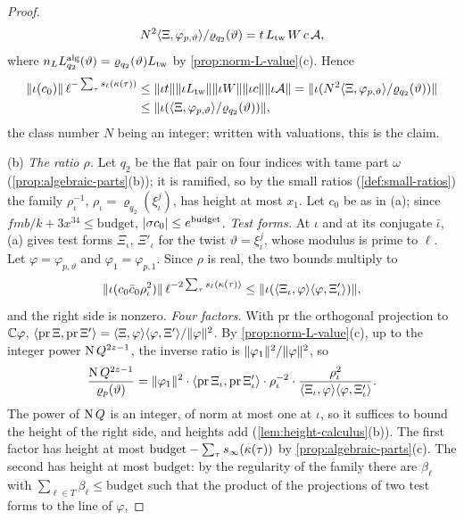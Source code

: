 \begin{proof}
\[
  N^2\langle\Xi,\varphi_{p,\vartheta}\rangle/\varrho_{q_2}(\vartheta)=t\,L_{\rm tw}\,W\,c\,\mathcal A,
\]
where $n_LL^{\rm alg}_{q_2}(\vartheta)=\varrho_{q_2}(\vartheta)L_{\rm tw}$ by \cref{prop:norm-L-value}(c). Hence
\begin{align*}
  \lVert \iota(c_0)\rVert\,\ell^{-\sum_\tau s_\ell(\kappa(\tau))}&\le\lVert \iota t\rVert\lVert \iota L_{\rm tw}\rVert\lVert \iota W\rVert\lVert \iota c\rVert\lVert \iota\mathcal A\rVert
  =\lVert \iota(N^2\langle\Xi,\varphi_{p,\vartheta}\rangle/\varrho_{q_2}(\vartheta))\rVert\\
  &\le\lVert \iota(\langle\Xi,\varphi_{p,\vartheta}\rangle/\varrho_{q_2}(\vartheta))\rVert,
\end{align*}
the class number $N$ being an integer; written with valuations, this is the claim.

(b) \emph{The ratio $\rho$.} Let $q_2$ be the flat pair on four indices with tame part $\omega$ (\cref{prop:algebraic-parts}(b)); it is ramified, so by the small ratios (\cref{def:small-ratios}) the family $\rho_\iota^{-1}$, $\rho_\iota=\varrho_{q_2}(\xi_\iota^j)$, has
height at most $x_1$. Let $c_0$ be as in (a); since $fmb/k+3x^{34}\le\mathrm{budget}$, $\lvert \sigma c_0\rvert\le e^{\mathrm{budget}}$. \emph{Test forms.} At $\iota$ and at its conjugate $\bar\iota$, (a) gives test forms $\Xi_\iota$, $\Xi'_\iota$ for the twist
$\vartheta=\xi^j_\iota$, whose modulus is prime to $\ell$. Let $\varphi=\varphi_{p,\vartheta}$ and $\varphi_1=\varphi_{p,1}$. Since $\rho$ is real, the two bounds multiply to
\[
  \lVert \iota(c_0\bar c_0\rho_\iota^2)\rVert\,\ell^{-2\sum_\tau s_\ell(\kappa(\tau))}\le\lVert \iota(\langle\Xi_\iota,\varphi\rangle\langle\varphi,\Xi'_\iota\rangle)\rVert,
\]
and the right side is nonzero. \emph{Four factors.} With $\mathrm{pr}$ the orthogonal projection to $\mathbb{C}\varphi$, $\langle\mathrm{pr}\,\Xi,\mathrm{pr}\,\Xi'\rangle=\langle\Xi,\varphi\rangle\langle\varphi,\Xi'\rangle/\lVert \varphi\rVert^2$. By \cref{prop:norm-L-value}(c), up to the integer power $\operatorname{N} Q^{2z-1}$, the
inverse ratio is $\lVert \varphi_1\rVert^2/\lVert \varphi\rVert^2$, so
\[
  \frac{\operatorname{N} Q^{2z-1}}{\varrho_p(\vartheta)}=\lVert \varphi_1\rVert^2\cdot\langle\mathrm{pr}\,\Xi_\iota,\mathrm{pr}\,\Xi'_\iota\rangle\cdot\rho_\iota^{-2}\cdot\frac{\rho_\iota^2}{\langle\Xi_\iota,\varphi\rangle\langle\varphi,\Xi'_\iota\rangle}.
\]
The power of $\operatorname{N} Q$ is an integer, of norm at most one at $\iota$, so it suffices to bound the height of the right side, and heights add (\cref{lem:height-calculus}(b)). The first factor has height at most $\mathrm{budget}-\sum_\tau s_\infty(\kappa(\tau))$
by \cref{prop:algebraic-parts}(c). The second has height at most $\mathrm{budget}$: by the regularity of the family there are $\beta_\ell$ with $\sum_{\ell\in T}\beta_\ell\le\mathrm{budget}$ such that the product of the projections of two test forms to the line of $\varphi$,

\end{proof}
